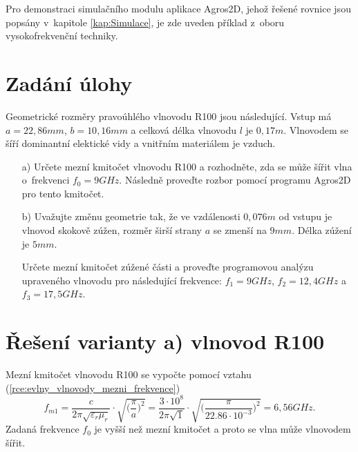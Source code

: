 
Pro demonstraci simulačního modulu aplikace Agros2D, jehož řešené rovnice jsou popsány v~kapitole \ref{kap:Simulace}, je zde uveden příklad z~oboru vysokofrekvenční techniky. 

\section{Zadání úlohy}
Geometrické rozměry pravoúhlého vlnovodu R100 jsou následující. Vstup má $a = 22,86 \unit{mm}$, $b = 10,16 \unit{mm}$ a celková délka vlnovodu $l$ je $0,17 \unit{m}$. Vlnovodem se šíří dominantní elektické vidy a vnitřním materiálem je vzduch. 
\begin{enumerate}
\item[a)] Určete mezní kmitočet vlnovodu R100 a rozhodněte, zda se může šířit vlna o~frekvenci $f_0 = 9 \unit{GHz}$. Následně proveďte rozbor pomocí programu Agros2D pro tento kmitočet. 
\item[b)] Uvažujte změnu geometrie tak, že ve vzdálenosti $0,076 \unit{m}$ od vstupu je vlnovod skokově zúžen, rozměr širší strany $a$ se zmenší na $9 \unit {mm}$. Délka zúžení je $5 \unit{mm}$. 

Určete mezní kmitočet zúžené části a proveďte programovou analýzu upraveného vlnovodu pro následující frekvence:  $f_1 = 9 \unit{GHz}$, $f_2 = 12,4 \unit{GHz}$ a $f_3 = 17,5 \unit{GHz}$.
\end{enumerate}

\section{Řešení varianty a) vlnovod R100}
Mezní kmitočet vlnovodu R100 se vypočte pomocí vztahu (\ref{rce:evlny_vlnovody_mezni_frekvence})
\begin{displaymath}
f_{m1} = \frac{c}{2\pi\sqrt{\varepsilon_{r}\mu_{r}}}\cdot\sqrt{\bigg(\frac{\pi}{a}\bigg)^{2}} = \frac{3\cdot 10^{8}}{2\pi\sqrt{1}}\cdot\sqrt{\bigg(\frac{\pi}{22.86\cdot 10^{-3}}\bigg)^{2}} = 6,56 \unit{GHz}.
\end{displaymath}
Zadaná frekvence $f_0$ je vyšší než mezní kmitočet a proto se vlna může vlnovodem šířit.

